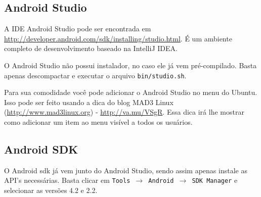 \subsection{Android Studio}

A IDE Android Studio pode ser encontrada em
\url{http://developer.android.com/sdk/installing/studio.html}. É um ambiente completo de
desenvolvimento baseado na IntelliJ IDEA.

O Android Studio não possui instalador, no caso ele já vem pré-compilado. Basta apenas
descompactar e executar o arquivo \texttt{bin/studio.sh}.

Para sua comodidade você pode adicionar o Android Studio no menu do Ubuntu. Isso pode ser feito
usando a dica do blog MAD3 Linux \\ (\url{http://www.mad3linux.org}) - \url{http://va.mu/VSgR}.
Essa dica irá lhe mostrar como adicionar um item ao menu visível a todos os usuários.

\subsection{Android SDK \label{ssec:sdk}}



O Android \gls{sdk} já vem junto do Android Studio, sendo assim apenas instale as API's
necessárias. Basta clicar em \texttt{Tools $\rightarrow$ Android $\rightarrow$ SDK Manager}
e selecionar as versões 4.2 e 2.2.



